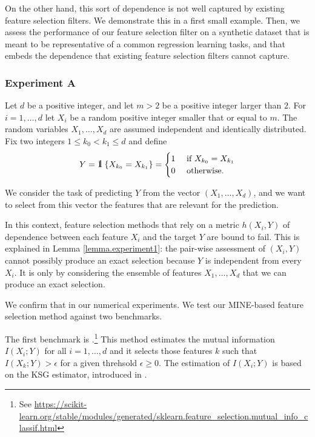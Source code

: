 On the other hand,
this sort of dependence
is not well captured by
existing feature selection filters. 
We demonstrate this in a first small example.
Then,
we assess the performance of our feature selection filter 
on a synthetic dataset that 
is meant to be representative of a common regression learning tasks,
and that embeds the dependence that 
existing feature selection filters cannot capture.

\subsubsection{Experiment A}
Let
$d$
be a positive integer,
and 
let 
$m > 2$
be  a positive integer larger than $2$.
For
$i = 1, \dots, d$
let
$X_i$
be a random  positive integer
smaller that or equal to $m$.
The random variables
$X_1, \dots, X_d$
are assumed independent and identically distributed.
Fix 
two integers
$ 1 \leq k_0 < k_1 \leq d$
and 
define
\begin{equation}
	\label{eq.exp1Y}
	Y = \one\left\lbrace
	X_{k_0} = X_{k_1}
	\right
	\rbrace
	=
	\begin{cases}
		1 & \text{ if } X_{k_0} = X_{k_1}
		\\
		0 & \text{ otherwise}.
	\end{cases}
\end{equation}

We consider the task of predicting $Y$ from the vector 
$(X_1, \dots, X_d)$,
and 
we want to select 
from this vector 
the features that are relevant for the prediction.

In this context,
feature selection methods
that rely on a metric $h(X_i, Y)$ of dependence between 
each feature $X_i$ and the target $Y$ are bound to fail.
This is explained in Lemma \ref{lemma.experiment1}:
the pair-wise assessment of $(X_i, Y)$ 
cannot possibly produce an exact selection
because $Y$ is independent from every $X_i$. 
It is only by considering 
the ensemble of features $X_1, \dots, X_d$ 
that we can produce an exact selection.

We confirm that in our numerical experiments. 
We test 
our MINE-based feature selection method 
against 
two benchmarks.

The first benchmark is 
.\footnote{
See
\url{https://scikit-learn.org/stable/modules/generated/sklearn.feature\_selection.mutual\_info\_classif.html}
}
This method estimates the mutual information 
$I(X_i; Y)$ for all $i = 1, \dots, d$
and 
it selects those features $k$ such that 
$I(X_k; Y) > \epsilon$
for a given threhsold $\epsilon \geq 0$. 
The estimation of $I(X_i; Y)$ is based on the KSG estimator, 
introduced in 
\cite{KSG04est}.

